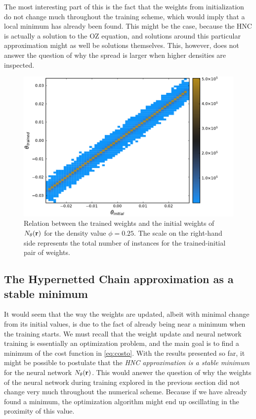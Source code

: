 The most interesting part of this is the fact that the weights from initialization
do not change much throughout the training scheme, which would imply that a local minimum
has already been found. This might be the case, because the HNC is actually a solution to
the OZ equation, and solutions around this particular approximation might as well be
solutions themselves.
This, however, does not answer the question of why the spread is larger when
higher densities are inspected.

\begin{figure}[t]
    \includegraphics[width=\textwidth]{figuras/capitulo-3/weights_phi=0.25.pdf}
    \caption[Comparison between weights, $\phi=0.25$.]{Relation between the trained weights and the initial weights of $N_{\theta}(\mathbf{r})$ for the density value $\phi=0.25$. The scale on the right-hand side represents the total number of instances for the trained-initial pair of weights.}
    \label{fig:pesos25}
\end{figure}

\subsection{The Hypernetted Chain approximation as a stable minimum}
It would seem that the way the weights are updated, albeit with minimal change from its
initial values, is due to the fact of already being near a minimum when the training starts.
We must recall that the weight update and neural network training is essentially an
optimization problem, and the main goal is to find a minimum
of the cost function in \autoref{eq:costo}. With the results presented so far, it might be
possible to postulate that the \emph{HNC approximation is a stable minimum} for the
neural network $N_{\theta}(\mathbf{r})$.
This would answer the question of why the weights of the neural network during training
explored in the previous section did not change very much throughout the numerical scheme.
Because if we have already found a minimum, the optimization algorithm might end up
oscillating in the proximity of this value.

